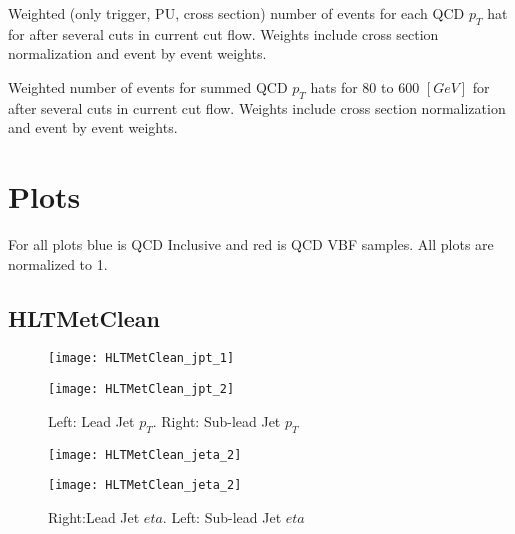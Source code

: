 \documentclass[a4paper,10pt]{article}
\begin{document}
\begin{table}[!h]
\centering
\resizebox{\linewidth}{!}{}
\caption{Weighted (only trigger, PU, cross section) number of events for each QCD $p_T$ hat for after several cuts in current cut flow. Weights include cross section normalization and event by event weights.}
\end{table}

\begin{table}[!h]
\centering

\caption{Weighted number of events for summed QCD $p_T$ hats for 80 to 600 $[GeV]$ for after several cuts in current cut flow. Weights include cross section normalization and event by event weights.}
\end{table}

\clearpage
\section{Plots}

For all plots blue is QCD Inclusive and red is QCD VBF samples. All plots are normalized to 1.

\subsection{HLTMetClean}

\begin{figure}[!h]
\centering
\begin{minipage}[!h]{0.4\linewidth}
\centering
\texttt{[image: HLTMetClean\_jpt\_1]}
\end{minipage}%
\begin{minipage}[!h]{0.4\linewidth}
  \texttt{[image: HLTMetClean\_jpt\_2]}
\end{minipage}
\caption{Left: Lead Jet $p_T$. Right: Sub-lead Jet $p_T$}
\end{figure}

\begin{figure}[!h]
\centering
\begin{minipage}[!h]{0.4\linewidth}
\centering
\texttt{[image: HLTMetClean\_jeta\_2]}
\end{minipage}%
\begin{minipage}[!h]{0.4\linewidth}
\centering
\texttt{[image: HLTMetClean\_jeta\_2]}
\end{minipage}
\caption{Right:Lead Jet $eta$. Left: Sub-lead Jet $eta$}
\end{figure}
\end{document}
